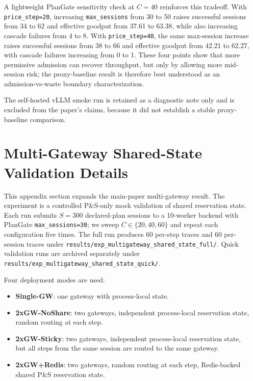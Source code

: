 \documentclass[sigconf,anonymous]{acmart}
\begin{document}
A lightweight PlanGate sensitivity check at $C{=}40$ reinforces this tradeoff. With \texttt{price\_step=20}, increasing \texttt{max\_sessions} from 30 to 50 raises successful sessions from 34 to 62 and effective goodput from 37.61 to 63.38, while also increasing cascade failures from 4 to 8. With \texttt{price\_step=40}, the same max-session increase raises successful sessions from 38 to 66 and effective goodput from 42.21 to 62.27, with cascade failures increasing from 0 to 1. These four points show that more permissive admission can recover throughput, but only by allowing more mid-session risk; the proxy-baseline result is therefore best understood as an admission-vs-waste boundary characterization.

The self-hosted vLLM smoke run is retained as a diagnostic note only and is excluded from the paper's claims, because it did not establish a stable proxy-baseline comparison.

\section{Multi-Gateway Shared-State Validation Details}
\label{sec:multigateway_appendix}

This appendix section expands the main-paper multi-gateway result. The experiment is a controlled P\&S-only mock validation of shared reservation state. Each run submits $S{=}300$ declared-plan sessions to a 10-worker backend with PlanGate \texttt{max\_sessions=30}; we sweep $C\in\{20,40,60\}$ and repeat each configuration five times. The full run produces 60 per-step traces and 60 per-session traces under \texttt{results/exp\_multigateway\_shared\_state\_full/}. Quick validation runs are archived separately under \texttt{results/exp\_multigateway\_shared\_state\_quick/}.

Four deployment modes are used:
\begin{itemize}
  \item \textbf{Single-GW}: one gateway with process-local state.
  \item \textbf{2xGW-NoShare}: two gateways, independent process-local reservation state, random routing at each step.
  \item \textbf{2xGW-Sticky}: two gateways, independent process-local reservation state, but all steps from the same session are routed to the same gateway.
  \item \textbf{2xGW+Redis}: two gateways, random routing at each step, Redis-backed shared P\&S reservation state.
\end{itemize}
\end{document}
